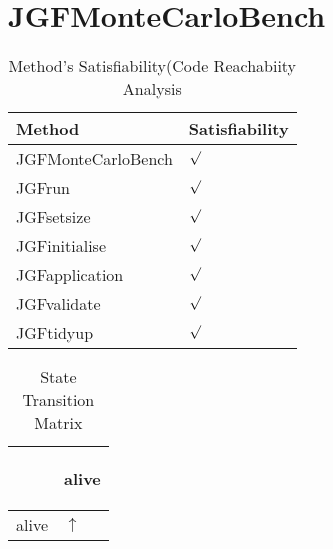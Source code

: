 \documentclass[10pt]{article}
\begin{document}
\section{{\color{Fuchsia}JGFMonteCarloBench}}
\label{JGFMonteCarloBench}
\begin{longtable}{|l|l|}
\caption{Method's Satisfiability(Code Reachabiity Analysis}\\
\hline
Method & Satisfiability\\
\hline
JGFMonteCarloBench&{\color{blue}$\surd$}\\
\hline
JGFrun&{\color{blue}$\surd$}\\
\hline
JGFsetsize&{\color{blue}$\surd$}\\
\hline
JGFinitialise&{\color{blue}$\surd$}\\
\hline
JGFapplication&{\color{blue}$\surd$}\\
\hline
JGFvalidate&{\color{blue}$\surd$}\\
\hline
JGFtidyup&{\color{blue}$\surd$}\\
\hline
\end{longtable}
\begin{longtable}{|l|l|}
\caption{State Transition Matrix}\\
\hline
&\begin{sideways}alive\end{sideways}\\
\hline
alive&{\color{blue}$\uparrow$}\\
\hline
\end{longtable}
\end{document}
